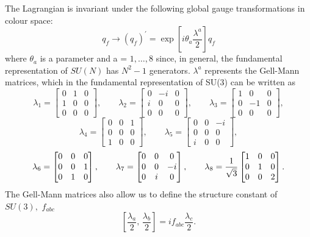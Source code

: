 \documentclass[10pt,a4paper]{book}
\begin{document}
The Lagrangian is invariant under the following global gauge transformations in colour space:
\begin{equation}
q_f \rightarrow (q_f)^\prime = \exp[i\theta_a\frac{\lambda^a}{2}]q_f
\end{equation}
where $\theta_a$ is a parameter and a = $1, \dots, 8$ since, in general, the fundamental representation of $SU(N)$ has $N^2 - 1$ generators. $\lambda^a$ represents the Gell-Mann matrices, which in the fundamental representation of SU(3) can be written as
\begin{equation*}
\lambda_1 = \begin{bmatrix} 0 & 1 & 0 \\ 1 & 0 & 0 \\ 0 & 0 & 0 \end{bmatrix}, \qquad
\lambda_2 = \begin{bmatrix} 0 & -i & 0 \\ i & 0 & 0 \\ 0 & 0 & 0 \end{bmatrix}, \qquad
\lambda_3 = \begin{bmatrix} 1 & 0 & 0 \\ 0 & -1 & 0 \\ 0 & 0 & 0 \end{bmatrix},
\end{equation*}
\begin{equation}
\lambda_4 = \begin{bmatrix} 0 & 0 & 1 \\ 0 & 0 & 0 \\ 1 & 0 & 0 \end{bmatrix}, \qquad
\lambda_5 = \begin{bmatrix} 0 & 0 & -i \\ 0 & 0 & 0 \\ i & 0 & 0 \end{bmatrix},
\end{equation}
\begin{equation*}
\lambda_6 = \begin{bmatrix} 0 & 0 & 0 \\ 0 & 0 & 1 \\ 0 & 1 & 0 \end{bmatrix},\qquad
\lambda_7 = \begin{bmatrix} 0 & 0 & 0 \\ 0 & 0 & -i \\ 0 & i & 0 \end{bmatrix}, \qquad
\lambda_8 = \frac{1}{\sqrt{3}} \begin{bmatrix} 1 & 0 & 0 \\ 0 & 1 & 0 \\ 0 & 0 & 2
\end{bmatrix}.\\
\end{equation*}
The Gell-Mann matrices also allow us to define the structure constant of $SU(3),$ $f_{abc}$
\begin{equation}
\left[\frac{\lambda_a}{2}, \, \frac{\lambda_b}{2}\right] = if_{abc}\frac{\lambda_c}{2}. 
\end{equation}
\end{document}
